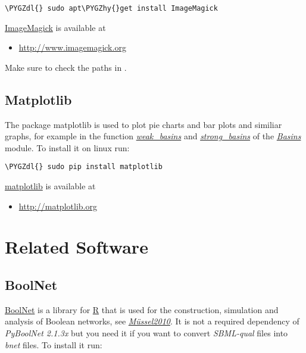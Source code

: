 \documentclass[letterpaper,10pt,english]{sphinxmanual}
\def\PYGZdl{\char`\$}
\def\PYGZhy{\char`\-}
\begin{document}
\begin{Verbatim}[commandchars=\\\{\}]
\PYGZdl{} sudo apt\PYGZhy{}get install ImageMagick
\end{Verbatim}

\href{http://www.imagemagick.org/script/index.php}{ImageMagick} is available at
\begin{itemize}
\item {} 
\href{http://www.imagemagick.org}{http://www.imagemagick.org}

\end{itemize}

Make sure to check the paths in .


\subsection{Matplotlib}
\label{Installation:matplotlib}\label{Installation:installation-matplotlib}
The package matplotlib is used to plot pie charts and bar plots and similiar graphs,
for example in the function {\hyperref[Basins:weak-basins]{\emph{weak\_basins}}} and {\hyperref[Basins:strong-basins]{\emph{strong\_basins}}} of the {\hyperref[Basins:basins]{\emph{Basins}}} module.
To install it on linux run:

\begin{Verbatim}[commandchars=\\\{\}]
\PYGZdl{} sudo pip install matplotlib
\end{Verbatim}

\href{http://matplotlib.org}{matplotlib} is available at
\begin{itemize}
\item {} 
\href{http://matplotlib.org}{http://matplotlib.org}

\end{itemize}


\section{Related Software}
\label{Installation:related-software}

\subsection{BoolNet}
\label{Installation:boolnet}\label{Installation:installation-boolnet}
\href{https://cran.r-project.org/web/packages/BoolNet/index.html}{BoolNet} is a library for \href{https://www.r-project.org/}{R} that is used for the construction, simulation and analysis of Boolean networks, see {\hyperref[Bibliography:mussel2010]{\emph{Müssel2010}}}.
It is not a required dependency of \emph{PyBoolNet 2.1.3x} but you need it if you want to convert \emph{SBML-qual} files into \emph{bnet} files.
To install it run:
\end{document}
